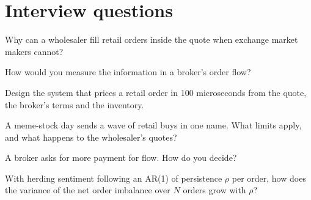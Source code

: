 \section{Interview questions}

\begin{interviewq}\label{iq:hf:retail-wholesaling:1}
Why can a wholesaler fill retail orders inside the quote when exchange market makers cannot?
\end{interviewq}

\begin{interviewq}\label{iq:hf:retail-wholesaling:2}
How would you measure the information in a broker's order flow?
\end{interviewq}

\begin{interviewq}\label{iq:hf:retail-wholesaling:3}
Design the system that prices a retail order in 100 microseconds from the quote, the broker's terms and the inventory.
\end{interviewq}

\begin{interviewq}\label{iq:hf:retail-wholesaling:4}
A meme-stock day sends a wave of retail buys in one name. What limits apply, and what happens to the wholesaler's quotes?
\end{interviewq}

\begin{interviewq}\label{iq:hf:retail-wholesaling:5}
A broker asks for more payment for flow. How do you decide?
\end{interviewq}

\begin{interviewq}\label{iq:hf:retail-wholesaling:6}
With herding sentiment following an AR(1) of persistence $\rho$ per order, how does the variance of the net order imbalance over $N$ orders grow
with $\rho$?
\end{interviewq}
